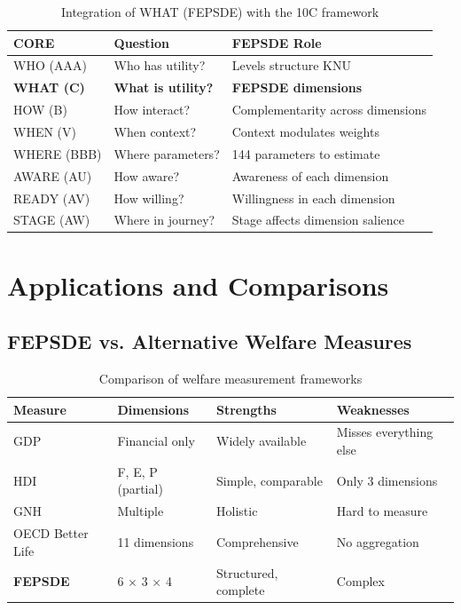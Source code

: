 \begin{table}[h]
\centering
\begin{tabular}{lll}
\toprule
\textbf{CORE} & \textbf{Question} & \textbf{FEPSDE Role} \\
\midrule
WHO (AAA) & Who has utility? & Levels structure KNU \\
\textbf{WHAT (C)} & \textbf{What is utility?} & \textbf{FEPSDE dimensions} \\
HOW (B) & How interact? & Complementarity across dimensions \\
WHEN (V) & When context? & Context modulates weights \\
WHERE (BBB) & Where parameters? & 144 parameters to estimate \\
AWARE (AU) & How aware? & Awareness of each dimension \\
READY (AV) & How willing? & Willingness in each dimension \\
STAGE (AW) & Where in journey? & Stage affects dimension salience \\
\bottomrule
\end{tabular}
\caption{Integration of WHAT (FEPSDE) with the 10C framework}
\label{tab:10c-fepsde-integration}
\end{table}



\section{Applications and Comparisons}
\label{sec:fepsde-applications}


\subsection{FEPSDE vs. Alternative Welfare Measures}

\begin{table}[h]
\centering
\begin{tabular}{llll}
\toprule
\textbf{Measure} & \textbf{Dimensions} & \textbf{Strengths} & \textbf{Weaknesses} \\
\midrule
GDP & Financial only & Widely available & Misses everything else \\
HDI & F, E, P (partial) & Simple, comparable & Only 3 dimensions \\
GNH & Multiple & Holistic & Hard to measure \\
OECD Better Life & 11 dimensions & Comprehensive & No aggregation \\
\textbf{FEPSDE} & 6 $\times$ 3 $\times$ 4 & Structured, complete & Complex \\
\bottomrule
\end{tabular}
\caption{Comparison of welfare measurement frameworks}
\label{tab:welfare-comparison}
\end{table}

